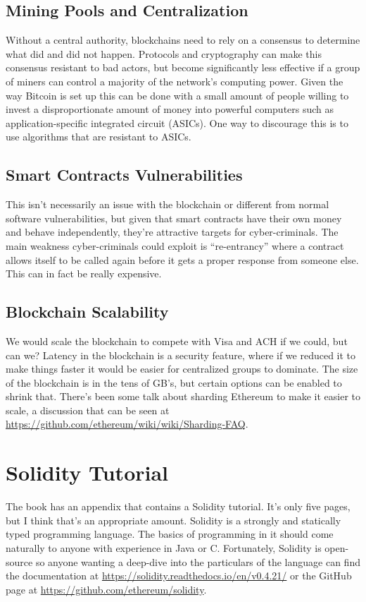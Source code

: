 \documentclass{article}
\begin{document}
\subsection{Mining Pools and Centralization}
Without a central authority, blockchains need to rely on a consensus to determine what did and did not happen. Protocols and cryptography can make this consensus resistant to bad actors, but become significantly less effective if a group of miners can control
a majority of the network's computing power. Given the way Bitcoin is set up this can be done with a small amount of people willing
to invest a disproportionate amount of money into powerful computers such as application-specific integrated circuit (ASICs). One way to discourage this is to use algorithms that are resistant to ASICs.

\subsection{Smart Contracts Vulnerabilities}
This isn't necessarily an issue with the blockchain or different from normal software vulnerabilities, but given that smart contracts have their own money and behave independently, they're attractive targets for cyber-criminals. The main weakness cyber-criminals could exploit is ``re-entrancy'' where a contract allows itself to be called again before it gets a proper response from someone else. This can in fact be really expensive.

\subsection{Blockchain Scalability}
We would scale the blockchain to compete with Visa and ACH if we could, but can we? Latency in the blockchain is a security feature, where if we reduced it to make things faster it would be easier for centralized groups to dominate. The size of the blockchain is in the
tens of GB's, but certain options can be enabled to shrink that. There's been some talk about sharding Ethereum to make it easier to scale, a discussion that can be seen at \url{https://github.com/ethereum/wiki/wiki/Sharding-FAQ}.

\section{Solidity Tutorial}
The book has an appendix that contains a Solidity tutorial. It's only five pages, but I think that's an appropriate amount. Solidity is a strongly and statically typed programming language. The basics of programming in it should come naturally to anyone with experience in Java or C. Fortunately, Solidity is open-source so
anyone wanting a deep-dive into the particulars of the language can find the documentation at \url{https://solidity.readthedocs.io/en/v0.4.21/} or the GitHub page at \url{https://github.com/ethereum/solidity}.
\end{document}
